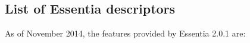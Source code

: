 \begin{appendices}
\makeatletter
\renewcommand*\FormatBlockHeading[1]{%
  \leftskip\@titleindent
  #1{\noindent
  \ifHeadingNumbered
    \@chapapp\ \mw@seccntformat\HeadingNumber
  \fi
  \ignorespaces\HeadingText\@@par}
  }
\makeatother
\chapter{List of Essentia descriptors} 

\label{AppendixA}

As of November 2014, the features provided by Essentia 2.0.1 are:

\begin{center}
\begin{longtable}{ p{} p{} p{} } 


\end{longtable}
\end{center}
\end{appendices}
